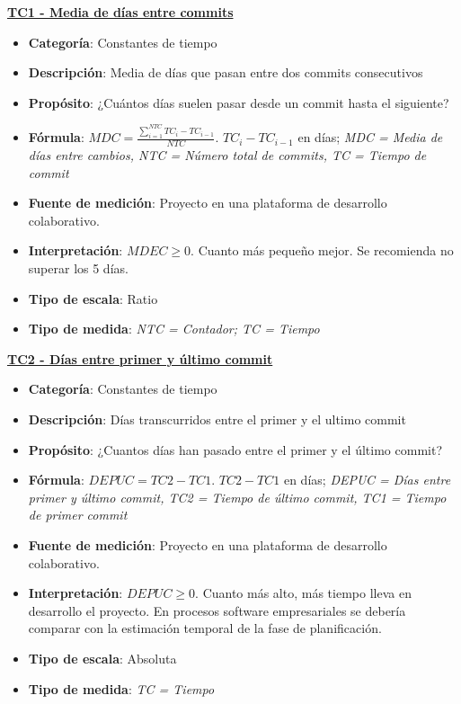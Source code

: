 \textbf{\underline{TC1 - Media de días entre commits}}

\begin{itemize}
	\tightlist
	\item \textbf{Categoría}: Constantes de tiempo
	\item \textbf{Descripción}: Media de días que pasan entre dos commits consecutivos
	\item \textbf{Propósito}: ¿Cuántos días suelen pasar desde un commit hasta el siguiente?
	\item \textbf{Fórmula}: $MDC = \frac{\sum_{i=1}^{NTC} TC_i - TC_{i-1}}{NTC}$. $TC_i - TC_{i-1}$ en días; \textit{MDC = Media de días entre cambios, NTC = Número total de commits, TC = Tiempo de commit}
	\item \textbf{Fuente de medición}: Proyecto en una plataforma de desarrollo colaborativo.
	\item \textbf{Interpretación}: $MDEC \geq 0$. Cuanto más pequeño mejor. Se recomienda no superar los 5 días.
	\item \textbf{Tipo de escala}: Ratio
	\item \textbf{Tipo de medida}: \textit{NTC = Contador; TC = Tiempo}
\end{itemize}

\textbf{\underline{TC2 - Días entre primer y último commit}}

\begin{itemize}
	\tightlist
	\item \textbf{Categoría}: Constantes de tiempo
	\item \textbf{Descripción}: Días transcurridos entre el primer y el ultimo commit 
	\item \textbf{Propósito}: ¿Cuantos días han pasado entre el primer y el último commit?
	\item \textbf{Fórmula}: $DEPUC = TC2- TC1$. $TC2- TC1$ en días;  \textit{DEPUC = Días entre primer y último commit, TC2 = Tiempo de último commit, TC1 = Tiempo de primer commit}
	\item \textbf{Fuente de medición}: Proyecto en una plataforma de desarrollo colaborativo.
	\item \textbf{Interpretación}: $DEPUC \geq 0$. Cuanto más alto, más tiempo lleva en desarrollo el proyecto. En procesos software empresariales se debería comparar con la estimación temporal de la fase de planificación. 
	\item \textbf{Tipo de escala}: Absoluta
	\item \textbf{Tipo de medida}: \textit{TC = Tiempo}
\end{itemize}

